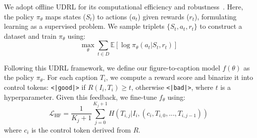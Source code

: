 \documentclass[11pt]{article}
\renewcommand{\cite}[1]{\citep{#1}}
\begin{document}
We adopt offline UDRL for its computational efficiency and robustness~\cite{emmons2021rvs}. Here, the policy $\pi_\theta$ maps states ($S_t$) to actions ($a_t$) given rewards ($r_t$), formulating learning as a supervised problem. We sample triplets $\{S_t, a_t, r_t\}$ to construct a dataset and train $\pi_\theta$ using:
\begin{equation}
    \max_{\theta}\sum_{t \in D} \mathbb{E} [ \log \pi_\theta (a_t | S_t, r_t)]
\end{equation}

Following this UDRL framework, we define our figure-to-caption model $f(\theta)$ as the policy $\pi_\theta$. For each caption $T_i$, we compute a reward score and binarize it into control tokens: \texttt{<|good|>} if $R(I_i, T_i) \geq t$, otherwise \texttt{<|bad|>}, where $t$ is a hyperparameter. Given this feedback, we fine-tune $f_\theta$ using:
\begin{equation}
    \mathcal{L}_\text{HF} = \frac{1}{K_j +1}\sum\limits_{j=0}^{K_j + 1} H(T_{i,j} | I_i, (c_i,T_{i,0}, ...,T_{i,j-1}))
\end{equation}
where $c_i$ is the control token derived from $R$.





\end{document}
